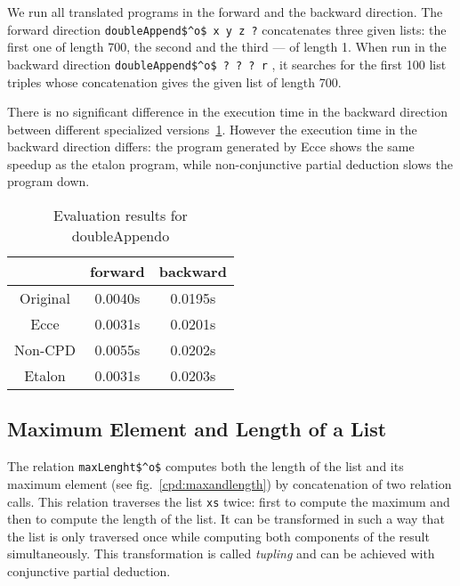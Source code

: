 We run all translated programs in the forward and the backward direction.
The forward direction \lstinline{doubleAppend$^o$ x y z ?} concatenates three given lists: the first one of length 700, the second and the third --- of length 1.
When run in the backward direction \lstinline{doubleAppend$^o$ ? ? ? r} , it searches for the first 100 list triples whose concatenation gives the given list of length 700.

There is no significant difference in the execution time in the backward direction between different specialized versions~\ref{tbl:doubleApp}.
However the execution time in the backward direction differs: the program generated by Ecce shows the same speedup as the etalon program, while non-conjunctive partial deduction slows the program down.

\begin{table}
  \centering
  \begin{tabular}{c||c||c}
                   & forward & backward \\
  \hline\hline
  Original         & 0.0040s & 0.0195s \\ \hline
  Ecce             & 0.0031s & 0.0201s \\ \hline
  Non-CPD          & 0.0055s & 0.0202s \\ \hline
  Etalon           & 0.0031s & 0.0203s \\
  \end{tabular}
  \caption{Evaluation results for doubleAppendo}
  \label{tbl:doubleApp}
\end{table}

\subsection{Maximum Element and Length of a List}

The relation \lstinline{maxLenght$^o$} computes both the length of the list and its maximum element (see fig.~\ref{cpd:maxandlength}) by concatenation of two relation calls.
This relation traverses the list \lstinline{xs} twice: first to compute the maximum and then to compute the length of the list.
It can be transformed in such a way that the list is only traversed once while computing both components of the result simultaneously.
This transformation is called \emph{tupling} and can be achieved with conjunctive partial deduction.

